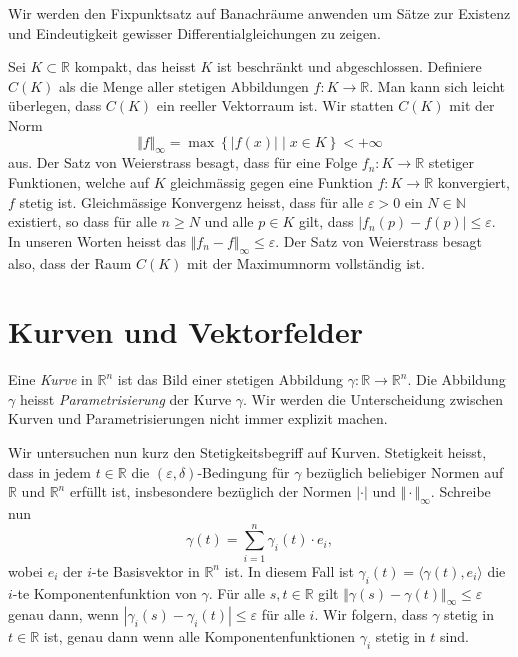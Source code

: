 \documentclass[../main.tex]{subfiles}
\begin{document}
Wir werden den Fixpunktsatz auf Banachräume
anwenden um Sätze zur Existenz und Eindeutigkeit
gewisser Differentialgleichungen zu zeigen.

\begin{example}
  Sei $K \subset \mathbb{R}$ kompakt,
  das heisst $K$ ist beschränkt und abgeschlossen.
  Definiere $C(K)$ als die Menge aller stetigen
  Abbildungen  $f \colon K \to \mathbb{R}$.
  Man kann sich leicht überlegen,
  dass $C(K)$ ein reeller Vektorraum ist.
  Wir statten $C(K)$ mit der Norm
  \[
    \Vert f \Vert_{\infty} =
    \max \left\{|f(x)| \mid x \in K\right\} < +\infty
  \]
  aus. Der Satz von Weierstrass besagt,
  dass für eine Folge $f_n \colon K \to \mathbb{R}$ 
  stetiger Funktionen, welche auf $K$ 
  gleichmässig gegen eine Funktion $f \colon K \to \mathbb{R}$
  konvergiert, $f$ stetig ist.
  Gleichmässige Konvergenz heisst,
  dass für alle $\varepsilon > 0$ 
  ein $N \in \mathbb{N}$ existiert, so dass
  für alle $n \geq N$ und alle $p \in K$ gilt,
  dass $|f_n(p) - f(p)| \leq \varepsilon$.
  In unseren Worten heisst das
  $\Vert f_n - f \Vert_{\infty} \leq \varepsilon$.
  Der Satz von Weierstrass besagt also,
  dass der Raum $C(K)$ mit der Maximumnorm vollständig ist.
\end{example}

\section{Kurven und Vektorfelder}
\begin{definition}
  Eine \emph{Kurve} in $\mathbb{R}^n$ 
  ist das Bild einer stetigen Abbildung
  $\gamma \colon \mathbb{R} \to \mathbb{R}^n$.
  Die Abbildung $\gamma$ heisst
  \emph{Parametrisierung} der Kurve $\gamma$.
  Wir werden die Unterscheidung zwischen Kurven
  und Parametrisierungen nicht immer explizit
  machen.
\end{definition}

Wir untersuchen nun kurz den Stetigkeitsbegriff auf Kurven.
Stetigkeit heisst, dass in jedem $t \in \mathbb{R}$ die
$(\varepsilon, \delta)$-Bedingung für $\gamma$ 
bezüglich beliebiger Normen auf $\mathbb{R}$ und $\mathbb{R}^n$ 
erfüllt ist, insbesondere
bezüglich der Normen $| \cdot |$ und $\Vert \cdot \Vert_{\infty}$.
Schreibe nun 
\[
  \gamma(t) = \sum_{i=1}^{n} \gamma_i(t) \cdot e_i,
\]
wobei $e_i$ der $i$-te Basisvektor in $\mathbb{R}^n$ ist.
In diesem Fall ist $\gamma_i(t) = \langle \gamma(t), e_i \rangle$  %
die $i$-te Komponentenfunktion von $\gamma$.
Für alle $s, t \in \mathbb{R}$ gilt
$\Vert \gamma(s) - \gamma(t) \Vert_\infty \leq \varepsilon$ 
genau dann, wenn $|\gamma_i(s) - \gamma_i(t)| \leq \varepsilon$
für alle  $i$.
Wir folgern, dass $\gamma$ stetig in $t \in \mathbb{R}$ 
ist, genau dann wenn alle Komponentenfunktionen
$\gamma_i$ stetig in $t$ sind.
\end{document}
